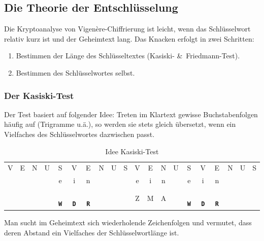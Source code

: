 \documentclass[%
11pt,%
twoside,%
titlepage,%
german,%
headsepline%
]{scrartcl}
\newcommand{\spaltenheight}{\rule{0mm}{3ex}}
\newcommand{\spaltensep}{\\[1ex]}
\begin{document}
\subsection{Die Theorie der Entschlüsselung}

Die Kryptoanalyse von Vigen\`ere-Chiffrierung ist leicht, wenn das Schlüsselwort relativ kurz ist und der Geheimtext lang. Das Knacken erfolgt in zwei Schritten:
\begin{enumerate}
\item Bestimmen der Länge des Schlüsseltextes (Kasiski- \&\ Friedmann-Test).
\item Bestimmen des Schlüsselwortes selbst.
\end{enumerate}

\subsubsection{Der Kasiski-Test}

Der Test basiert auf folgender Idee:
Treten im Klartext gewisse Buchstabenfolgen häufig auf (Trigramme u.ä.), so werden sie stets gleich übersetzt, wenn ein Vielfaches des Schlüsselwortes dazwischen passt.
\begin{table}
\begin{tabular}{cccccccccccccccccccc}
\spaltenheight V& E& N& U& S& V& E& N& U& S& V& E& N& U& S& V& E& N& U& S \spaltensep
\spaltenheight & & & & e& i& n& & & & e& i& n& & e& i& n& & &\spaltensep
\spaltenheight & & & & \textbf{\texttt{ W}}& \textbf{\texttt{ D}}& \textbf{\texttt{ R}}& & & & Z& M& A& & \textbf{\texttt{ W}}& \textbf{\texttt{ D}}& \textbf{\texttt{ R}}& & &\spaltensep
\end{tabular}
\caption{Idee Kasiski-Test}
\end{table}
Man sucht im Geheimtext sich wiederholende Zeichenfolgen und vermutet, dass
deren Abstand ein Vielfaches der Schlüsselwortlänge ist.
\end{document}
